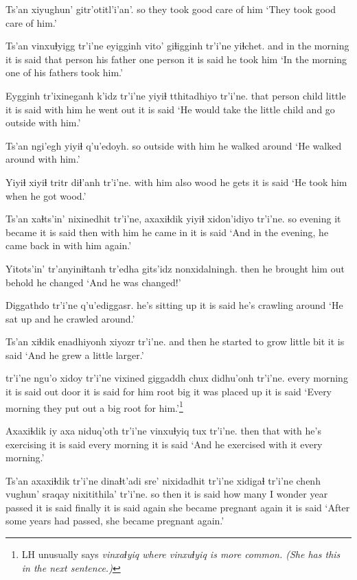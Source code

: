 \documentclass[12pt]{article}
\begin{document}
\gll Ts'an {xiyughun' gitr'otitl'i'an'.}
so {they took good care of him}
\glt `They took good care of him.'
\glend

\gll Ts'an vinxuɬyigg tr'i'ne eyigginh vito'  giɬigginh tr'i'ne yiɬchet.
and {in the morning} {it is said} {that person} {his father} {one person} {it is said} {he took him}
\glt `In the morning one of his fathers took him.'
\glend

\gll Eygginh tr'ixineganh k'idz tr'i'ne yiyiɬ tthitadhiyo tr'i'ne.
{that person} child   little {it is said} {with him} {he went out} {it is said}
\glt `He would take the little child and go outside with him.'
\glend

\gll Ts'an ngi'egh yiyiɬ  q'u'edoyh.
so outside {with him} {he walked around}
\glt `He walked around with him.'
\glend

\gll Yiyiɬ  xiyiɬ tritr diɬ'anh tr'i'ne.
{with him} also wood {he gets}  {it is said}
\glt `He took him when he got wood.'
\glend

\gll Ts'an xaɬts'in' nixinedhit tr'i'ne, axaxiɬdik yiyiɬ  xidon'idiyo  tr'i'ne.
so evening {it became} {it is said} then  {with him} {he came in}  {it is said}
\glt `And in the evening, he came back in with him again.'
\glend

\gll Yitots'in' tr'anyiniɬtanh tr'edha {gits'idz nonxidalningh.}
then  {he brought him out} behold  {he changed}
\glt `And he was changed!'
\glend

\gll Diggathdo tr'i'ne q'u'ediggasr.
{he's sitting up} {it is said} {he's crawling around}
\glt `He sat up and he crawled around.'
\glend

\gll Ts'an  xiɬdik  enadhiyonh  xiyozr tr'i'ne.
and  then  {he started to grow} {little bit}  {it is said}
\glt `And he grew a little larger.'
\glend

 tr'i'ne ngu'o xidoy tr'i'ne vixined giggaddh chux didhu'onh tr'i'ne.
{every morning}  {it is said} out door  {it is said} {for him}  root  big {it was placed up} {it is said}
\glt `Every morning they put out a big root for him.'\footnote{LH unusually says \em vinxaɬyiq \em where \em vinxuɬyiq \em is more common. (She has this in the next sentence.)}
\glend

\gll Axaxiɬdik iy axa niduq'oth tr'i'ne {vinxuɬyiq tux} tr'i'ne.
then  that with {he's exercising} {it is said} {every morning} {it is said}
\glt `And he exercised with it every morning.'
\glend

\gll Ts'an  axaxiɬdik  tr'i'ne dinaɬt'adi sre'  nixidadhit tr'i'ne xidigaɬ tr'i'ne chenh  {vughun' sraqay nixitithila'} tr'i'ne.
so  then {it is said} {how many} {I wonder} {year passed} {it is said} finally  {it is said} again  {she became pregnant again}  {it is said}
\glt `After some years had passed, she became pregnant again.'
\glend
\end{document}
